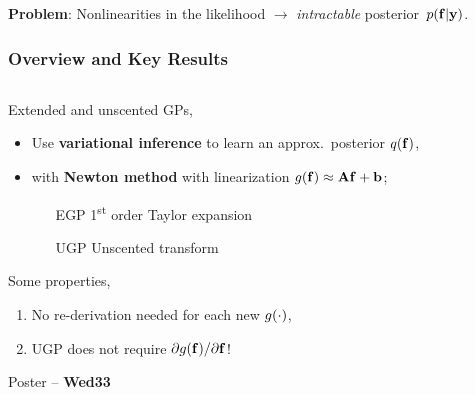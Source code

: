 \documentclass{beamer}
\begin{document}
\begin{frame}
\begin{columns}
\begin{column}{0.5\linewidth}
\begin{figure}

\end{figure}

\end{column}
\end{columns}

\vspace{4mm}

\textbf{Problem}: Nonlinearities in the likelihood $\rightarrow$ 
\emph{intractable} posterior~$p\!\left({\mathbf{f}}\middle\vert{\ensuremath{\mathbf{y}}}\right)$.
\vspace{3mm}


\end{frame}



\begin{frame}
    \frametitle{Overview and Key Results}


\vspace{-4mm}
\begin{columns}

\begin{column}{0.45\linewidth}

Extended and unscented GPs,
\begin{itemize}
    \footnotesize
    \item Use \textbf{variational inference} to learn an approx.\ posterior 
        $q\!\left({\mathbf{f}}\right)$,
    \item with \textbf{Newton method} with linearization
        $g\!\left({{\mathbf{f}}}\right) \approx \mathbf{A}\mathbf{f} + \mathbf{b}$;
    \begin{itemize}
        \footnotesize
        \item[EGP] 1\textsuperscript{st} order Taylor expansion
        \item[UGP] Unscented transform
    \end{itemize}
\end{itemize}

\vspace{5mm}
Some properties,
\begin{enumerate}
    \footnotesize
    \item No re-derivation needed for each new $g\!\left({{\cdot}}\right)$,
    \item UGP does not require $\partial g\!\left({{\mathbf{f}}}\right)\!/\partial{\ensuremath{\mathbf{f}}}$!
\end{enumerate}

\begin{block}{}
    \centering
    Poster -- \textbf{Wed33}
\end{block}


\end{column}
\end{columns}
\end{frame}
\end{document}
